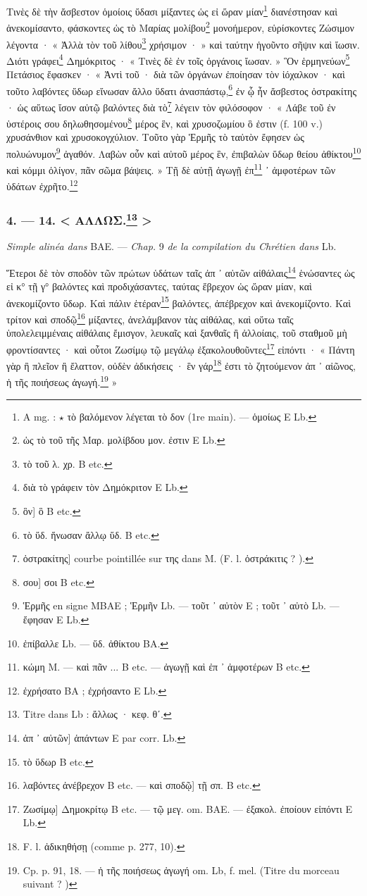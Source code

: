 \documentclass[a4paper, 11pt, oneside, polutonikogreek, french]{article}
\begin{document}
Τινὲς δὲ τὴν ἄσβεστον ὁμοίοις ὕδασι μίξαντες ὡς εἰ ὥραν μίαν\footnote{A mg. : $\star$ τὸ βαλόμενον λέγεται τὸ δον (1re main). --- ὁμοίως E Lb.} διανέστησαν καὶ ἀνεκομίσαντο, φάσκοντες ὡς τὸ Μαρίας μολίβου\footnote{ὡς τὸ τοῦ τῆς Μαρ. μολίβδου μον. ἐστιν E Lb.} μονοήμερον, εὑρίσκοντες Ζώσιμον λέγοντα · « Ἀλλὰ τὸν τοῦ λίθου\footnote{τὸ τοῦ λ. χρ. B etc.} χρήσιμον · » καὶ ταύτην ἡγοῦντο σῆψιν καὶ ἴωσιν. Διότι γράφει\footnote{διὰ τὸ γράφειν τὸν Δημόκριτον E Lb.} Δημόκριτος · « Τινὲς δὲ ἐν τοῖς ὀργάνοις ἴωσαν. » Ὃν ἑρμηνεύων\footnote{ὃν] ὃ B etc.} Πετάσιος ἔφασκεν · « Ἀντὶ τοῦ · διὰ τῶν ὀργάνων ἐποίησαν τὸν ἰόχαλκον · καὶ τοῦτο λαβόντες ὕδωρ εἵνωσαν ἄλλο ὕδατι ἀνασπάστῳ,\footnote{τὸ ὕδ. ἥνωσαν ἄλλῳ ὕδ. B etc.} ἐν ᾧ ἦν ἄσβεστος ὀστρακίτης · ὡς αὕτως ἴσον αὐτῷ βαλόντες διὰ τὸ\footnote{ὀστρακίτης] courbe pointillée sur της dans M. (F. l. ὀστράκιτις ? ).} λέγειν τὸν φιλόσοφον · « Λάβε τοῦ ἐν ὑστέροις σου δηλωθησομένου\footnote{σου] σοι B etc.} μέρος ἓν, καὶ χρυσοζωμίου ὃ ἐστιν (f. 100 v.) χρυσάνθιον καὶ χρυσοκογχύλιον. Τοῦτο γὰρ Ἑρμῆς τὸ ταὐτὸν ἔφησεν ὡς πολυώνυμον\footnote{Ἑρμῆς en signe MBAE ; Ἑρμῆν Lb. --- τοῦτ ᾽ αὐτὸν E ; τοῦτ ᾽ αὐτὸ Lb. --- ἔφησαν E Lb.} ἀγαθόν. Λαβὼν οὖν καὶ αὐτοῦ μέρος ἓν, ἐπιβαλὼν ὕδωρ θείου ἀθίκτου\footnote{ἐπίβαλλε Lb. --- ὕδ. ἀθίκτου BA.} καὶ κόμμι ὀλίγον, πᾶν σῶμα βάψεις. » Τῇ δὲ αὐτῇ ἀγωγῇ ἐπ\footnote{κώμη M. --- καὶ πᾶν ... B etc. --- ἀγωγῇ καὶ ἐπ ᾽ ἀμφοτέρων B etc.} ᾽ ἀμφοτέρων τῶν ὑδάτων ἐχρῆτο.\footnote{ἐχρήσατο BA ; ἐχρήσαντο E Lb.}

\bigskip
\centerline{\EightStarTaper}
\centerline{\EightStarTaper\EightStarTaper}
\bigskip

\subsubsection[4. --- 14. < ΑΛΛΩΣ. >]{4. --- 14. < ΑΛΛΩΣ.\footnote{Titre dans Lb : ἄλλως · κεφ. θʹ.} >}

\emph{Simple alinéa dans} BAE. --- \emph{Chap.} 9 \emph{de la compilation du Chrétien dans} Lb.

Ἕτεροι δὲ τὸν σποδὸν τῶν πρώτων ὑδάτων ταῖς ἀπ ᾽ αὐτῶν αἰθάλαις\footnote{ἀπ ᾽ αὐτῶν] ἁπάντων E par corr. Lb.} ἑνώσαντες ὡς εἰ κ° τῇ γ° βαλόντες καὶ προδιχάσαντες, ταύτας ἔβρεχον ὡς ὥραν μίαν, καὶ ἀνεκομίζοντο ὕδωρ. Καὶ πάλιν ἑτέραν\footnote{τὸ ὕδωρ B etc.} βαλόντες, ἀπέβρεχον καὶ ἀνεκομίζοντο. Καὶ τρίτον καὶ σποδῷ\footnote{λαβόντες ἀνέβρεχον B etc. --- καὶ σποδῷ] τῇ σπ. B etc.} μίξαντες, ἀνελάμβανον τὰς αἰθάλας, καὶ οὕτω ταῖς ὑπολελειμμέναις αἰθάλαις ἔμισγον, λευκαῖς καὶ ξανθαῖς ἢ ἀλλοίαις, τοῦ σταθμοῦ μὴ φροντίσαντες · καὶ οὗτοι Ζωσίμῳ τῷ μεγάλῳ ἐξακολουθοῦντες\footnote{Ζωσίμῳ] Δημοκρίτῳ B etc. --- τῷ μεγ. om. BAE. --- ἐξακολ. ἐποίουν εἰπόντι E Lb.} εἰπόντι · « Πάντη γὰρ ἢ πλεῖον ἢ ἔλαττον, οὐδὲν ἀδικήσεις · ἓν γάρ\footnote{F. l. ἀδικηθήσῃ (comme p. 277, 10).} ἐστι τὸ ζητούμενον ἀπ ᾽ αἰῶνος, ἡ τῆς ποιήσεως ἀγωγή.\footnote{Cp. p. 91, 18. --- ἡ τῆς ποιήσεως ἀγωγή om. Lb, f. mel. (Titre du morceau suivant ? )} »
\end{document}

